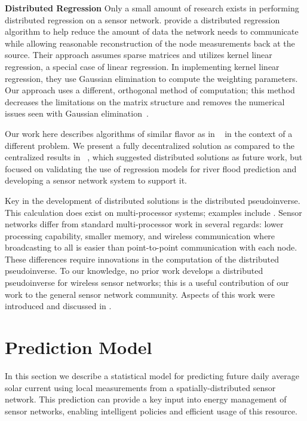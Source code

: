 \documentclass[prodmode,acmtosn]{acmsmall}
\begin{document}
{\bf Distributed Regression}\newline
Only a small amount of research exists in performing distributed regression on a sensor network.
\cite{guestrinIPSN2004} provide a distributed regression algorithm to help reduce the amount of data the network needs to communicate while allowing reasonable reconstruction of the node measurements back at the source.
Their approach assumes sparse matrices and utilizes kernel linear regression, a special case of linear regression.
In implementing kernel linear regression, they use Gaussian elimination to compute the weighting parameters.
Our approach uses a different, orthogonal method of computation; this method decreases the limitations on the matrix structure and removes the numerical issues seen with Gaussian elimination~\cite{golubMatrixBook1996}.

Our work here describes algorithms of similar flavor as in ~\cite{BashaSenSys2008} in the context of a different problem.
We present a fully decentralized solution as compared to the centralized results in ~\cite{BashaSenSys2008}, which suggested distributed solutions as future work, but focused on validating the use of regression models for river flood prediction and developing a sensor network system to support it.

Key in the development of distributed solutions is the distributed pseudoinverse.
This calculation does exist on multi-processor systems; examples include \cite{bensonBook1986,golubMatrixBook1996,milovanovicMCM1992,panPAA1990}.
Sensor networks differ from standard multi-processor work in several regards: lower processing capability, smaller memory, and wireless communication where broadcasting to all is easier than point-to-point communication with each node.
These differences require innovations in the computation of the distributed pseudoinverse.
To our knowledge, no prior work develops a distributed pseudoinverse for wireless sensor networks; this is a useful contribution of our work to the general sensor network community.
Aspects of this work were introduced and discussed in \cite{bashaPhD2010}.

\section{Prediction Model} \label{sec:solar-model}
In this section we describe a statistical model for predicting future daily average solar current using local measurements from a spatially-distributed sensor network.
This prediction can provide a key input into energy management of sensor networks, enabling intelligent policies and efficient usage of this resource.
\end{document}
